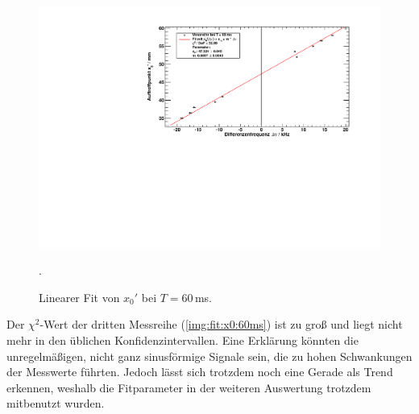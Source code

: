 \begin{figure}[H]
\begin{center}
  \includegraphics[width=\textwidth]{../img/fit_T_60ms.pdf}
  \caption{Linearer Fit von $x_0'$ bei $T = 60$\,ms.}.
  \label{img:fit:x0:60ms}
\end{center}
\end{figure}

Der $\chi^2$-Wert der dritten Messreihe (\autoref{img:fit:x0:60ms}) ist zu groß und liegt nicht mehr in den üblichen Konfidenzintervallen. Eine 
Erklärung könnten die unregelmäßigen, nicht ganz sinusförmige Signale sein, die zu hohen Schwankungen der Messwerte führten. Jedoch lässt sich 
trotzdem noch eine Gerade als Trend erkennen, weshalb die Fitparameter in der weiteren Auswertung trotzdem mitbenutzt wurden.




